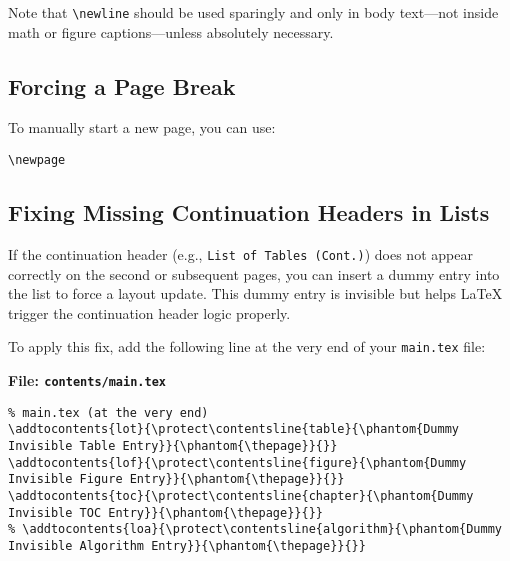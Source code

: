 \begin{subparagraph}
Note that \verb|\newline| should be used sparingly and only in body text—not inside math or figure captions—unless absolutely necessary.
\end{subparagraph}


\subsection{Forcing a Page Break}

\begin{subparagraph}
To manually start a new page, you can use:
\end{subparagraph}

\begin{verbatim}
\newpage
\end{verbatim}

\subsection{Fixing Missing Continuation Headers in Lists}

\begin{subparagraph}
If the continuation header (e.g., \texttt{List of Tables (Cont.)}) does not appear correctly on the second or subsequent pages, you can insert a dummy entry into the list to force a layout update. This dummy entry is invisible but helps LaTeX trigger the continuation header logic properly.
\end{subparagraph}

\begin{subparagraph}
To apply this fix, add the following line at the very end of your \texttt{main.tex} file:
\end{subparagraph}

\noindent\textbf{File: \texttt{contents/main.tex}}\vspace{-1em}
\begin{verbatim}
% main.tex (at the very end)
\addtocontents{lot}{\protect\contentsline{table}{\phantom{Dummy Invisible Table Entry}}{\phantom{\thepage}}{}}
\addtocontents{lof}{\protect\contentsline{figure}{\phantom{Dummy Invisible Figure Entry}}{\phantom{\thepage}}{}}
\addtocontents{toc}{\protect\contentsline{chapter}{\phantom{Dummy Invisible TOC Entry}}{\phantom{\thepage}}{}}
% \addtocontents{loa}{\protect\contentsline{algorithm}{\phantom{Dummy Invisible Algorithm Entry}}{\phantom{\thepage}}{}}
\end{verbatim}

